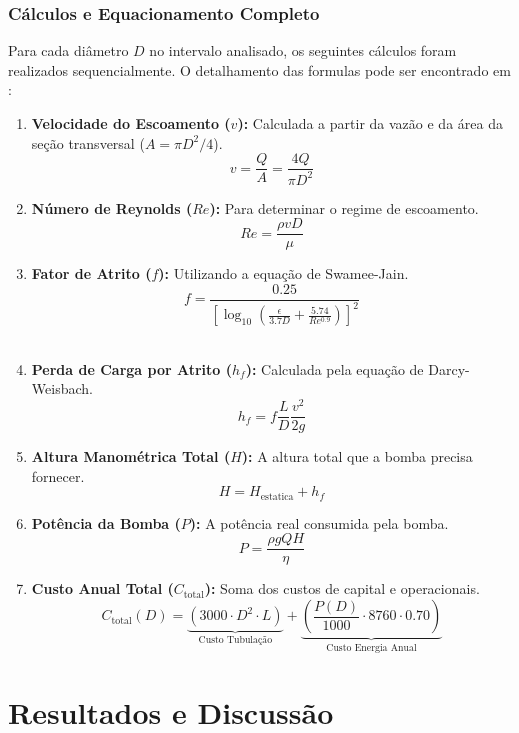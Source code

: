 \documentclass[12pt, a4paper]{article}
\begin{document}
    \subsubsection{Cálculos e Equacionamento Completo}
    \justifying
    Para cada diâmetro $D$ no intervalo analisado, os seguintes cálculos foram realizados sequencialmente. O detalhamento das formulas pode ser encontrado em \cite{formulas}: 

        \begin{enumerate}
            \item \textbf{Velocidade do Escoamento ($v$):} Calculada a partir da vazão e da área da seção transversal ($A = \pi D^2 / 4$).
            \[ v = \frac{Q}{A} = \frac{4Q}{\pi D^2} \]

            \item \textbf{Número de Reynolds ($Re$):} Para determinar o regime de escoamento.
            \[ Re = \frac{\rho v D}{\mu} \]

            \item \textbf{Fator de Atrito ($f$):} Utilizando a equação de Swamee-Jain.
            \[ f = \frac{0.25}{\left[ \log_{10}\left( \frac{\epsilon}{3.7D} + \frac{5.74}{Re^{0.9}} \right) \right]^2} \] \

            \item \textbf{Perda de Carga por Atrito ($h_f$):} Calculada pela equação de Darcy-Weisbach.
            \[ h_f = f \frac{L}{D} \frac{v^2}{2g} \]

            \item \textbf{Altura Manométrica Total ($H$):} A altura total que a bomba precisa fornecer.
            \[ H = H_{\text{estatica}} + h_f \]

            \item \textbf{Potência da Bomba ($P$):} A potência real consumida pela bomba.
            \[ P = \frac{\rho g Q H}{\eta} \]

            \item \textbf{Custo Anual Total ($C_{\text{total}}$):} Soma dos custos de capital e operacionais.
            \[ C_{\text{total}}(D) = \underbrace{(3000 \cdot D^2 \cdot L)}_{\text{Custo Tubulação}} + \underbrace{\left( \frac{P(D)}{1000} \cdot 8760 \cdot 0.70 \right)}_{\text{Custo Energia Anual}} \]
        \end{enumerate}


    \section{Resultados e Discussão}
\end{document}
